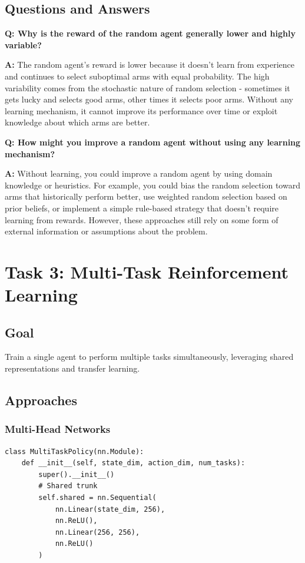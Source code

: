 \documentclass[12pt]{article}
\begin{document}
{{{\subsection{Questions and Answers}

\textbf{Q: Why is the reward of the random agent generally lower and highly variable?}

\textbf{A:} The random agent's reward is lower because it doesn't learn from experience and continues to select suboptimal arms with equal probability. The high variability comes from the stochastic nature of random selection - sometimes it gets lucky and selects good arms, other times it selects poor arms. Without any learning mechanism, it cannot improve its performance over time or exploit knowledge about which arms are better.

\textbf{Q: How might you improve a random agent without using any learning mechanism?}

\textbf{A:} Without learning, you could improve a random agent by using domain knowledge or heuristics. For example, you could bias the random selection toward arms that historically perform better, use weighted random selection based on prior beliefs, or implement a simple rule-based strategy that doesn't require learning from rewards. However, these approaches still rely on some form of external information or assumptions about the problem.

\section{Task 3: Multi-Task Reinforcement Learning}

\subsection{Goal}

Train a single agent to perform multiple tasks simultaneously, leveraging shared representations and transfer learning.

\subsection{Approaches}

\subsubsection{Multi-Head Networks}

\begin{verbatim}
class MultiTaskPolicy(nn.Module):
    def __init__(self, state_dim, action_dim, num_tasks):
        super().__init__()
        # Shared trunk
        self.shared = nn.Sequential(
            nn.Linear(state_dim, 256),
            nn.ReLU(),
            nn.Linear(256, 256),
            nn.ReLU()
        )
        

\end{verbatim}}}}
\end{document}
